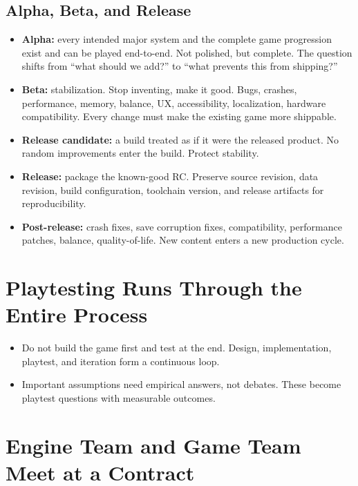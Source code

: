 \documentclass[
  11pt,
  letterpaper,
  DIV=11,
  numbers=noendperiod,
  twoside,
  open=right]{scrreprt}
\providecommand{\tightlist}{%
  \setlength{\itemsep}{0pt}\setlength{\parskip}{0pt}}
\begin{document}
\subsection{Alpha, Beta, and Release}\label{alpha-beta-and-release}

\begin{itemize}
\tightlist
\item
  \textbf{Alpha:} every intended major system and the complete game
  progression exist and can be played end-to-end. Not polished, but
  complete. The question shifts from ``what should we add?'' to ``what
  prevents this from shipping?''
\item
  \textbf{Beta:} stabilization. Stop inventing, make it good. Bugs,
  crashes, performance, memory, balance, UX, accessibility,
  localization, hardware compatibility. Every change must make the
  existing game more shippable.
\item
  \textbf{Release candidate:} a build treated as if it were the released
  product. No random improvements enter the build. Protect stability.
\item
  \textbf{Release:} package the known-good RC. Preserve source revision,
  data revision, build configuration, toolchain version, and release
  artifacts for reproducibility.
\item
  \textbf{Post-release:} crash fixes, save corruption fixes,
  compatibility, performance patches, balance, quality-of-life. New
  content enters a new production cycle.
\end{itemize}

\section{Playtesting Runs Through the Entire
Process}\label{playtesting-runs-through-the-entire-process}

\begin{itemize}
\tightlist
\item
  Do not build the game first and test at the end. Design,
  implementation, playtest, and iteration form a continuous loop.
\item
  Important assumptions need empirical answers, not debates. These
  become playtest questions with measurable outcomes.
\end{itemize}

\section{Engine Team and Game Team Meet at a
Contract}\label{engine-team-and-game-team-meet-at-a-contract}
\end{document}
